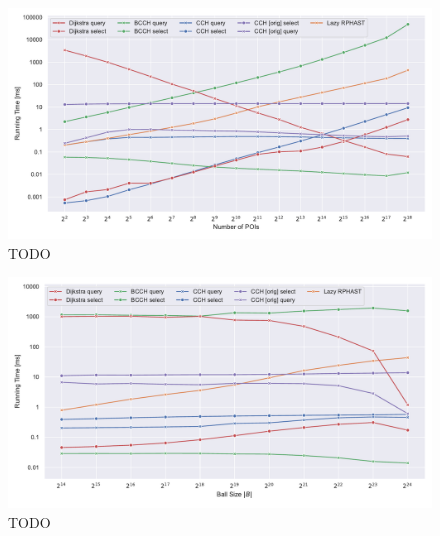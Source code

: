 \documentclass[a4paper, english, cleveref]{lipics-v2021}
\begin{document}
\begin{figure}
\centering
\includegraphics[width=\linewidth]{fig/repr_knn_num_pois.pdf}
\caption{
TODO
}\label{fig:knn_num_pois}
\end{figure}

\begin{figure}
\centering
\includegraphics[width=\linewidth]{fig/repr_knn_ball_size.pdf}
\caption{
TODO
}\label{fig:knn_ball_size}
\end{figure}
\end{document}
